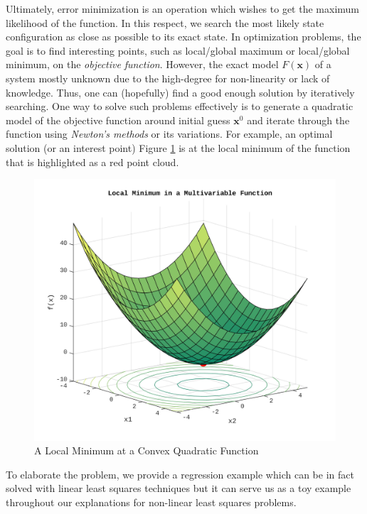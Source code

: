 \documentclass[a4paper]{report}
\numberwithin{figure}{section}
\begin{document}
\begin{appendices}
Ultimately, error minimization is an 
operation which wishes to get the maximum likelihood of the function. In this 
respect, 
we search the most 
likely state configuration as close as possible to its exact state. 
In optimization problems,
the goal is to find interesting points, such as local/global
maximum or local/global minimum, on the \textit{objective}
\textit{function}. However, the exact model $F(\mathbf{x})$ of a system 
mostly unknown due to the high-degree for non-linearity or lack of knowledge.
Thus, one can (hopefully) find a good enough solution by iteratively searching.
One way to solve such problems effectively is to generate a quadratic model of 
the objective function around initial guess $\mathbf{x}^0$ and iterate
through the function using \textit{Newton's methods} or its variations.
For example,
an optimal solution (or an interest point)
Figure \ref{fig:lsq_multivariable_function_example} is at the local
minimum of the function that is highlighted as a red point cloud.


\begin{figure}[H]
	\centering
  \includegraphics[width=0.7\linewidth,natwidth=640,natheight=640]
	{fig/lsq_multivariable_function_example.jpg}
	\caption{A Local Minimum at a Convex Quadratic Function}
	\label{fig:lsq_multivariable_function_example}
\end{figure}

To elaborate the problem, we provide a regression example 
which can be in fact solved with linear least squares techniques but 
it can serve us 
as a toy example throughout our explanations for non-linear least squares 
problems.


\end{appendices}
\end{document}

